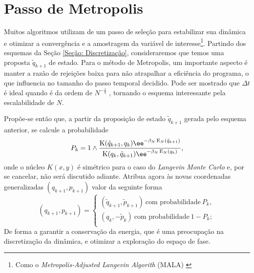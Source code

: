 \section{Passo de Metropolis}
\label{Section: Metropolis}

Muitos algoritmos utilizam de um passo de seleção para estabilizar sua dinâmica e otimizar a convergência e a amostragem da variável de interesse\footnote{Como o \textit{Metropolis-Adjusted Langevin Algorith} (MALA) \cite[Anexo~C]{leimmolecular}}. Partindo dos esquemas da Seção \ref{Seção: Discretização}, consideraremos que temos uma proposta $\tilde{q}_{k+1}$ de estado. Para o método de Metropolis, um importante aspecto é manter a razão de rejeições baixa para não atrapalhar a eficiência do programa, o que influencia no tamanho do passo temporal decidido. Pode ser mostrado que $\Delta t$ é ideal quando é da ordem de $N^{-\frac{1}{4}}$ \cite{Chafa2018}, tornando o esquema interessante pela escalabilidade de $N$.

Propõe-se então que, a partir da proposição de estado $\tilde{q}_{k+1}$ gerada pelo esquema anterior, se calcule a probabilidade
\begin{equation}
P_k = 1 \wedge \frac{\K(\tilde{q}_{k+1}, q_k) \ee^{-\beta_N \Ee_N(\tilde{q}_{k+1})}}{\K(q_k, \tilde{q}_{k+1}) \ee^{-\beta_N \Ee_N(q_{k})}},
\label{Equation: Pk}
\end{equation}
onde o núcleo $K(x, y)$ é simétrico \cite{Chafa2018} para o caso do \textit{Langevin Monte Carlo} e, por se cancelar, não será discutido adiante. Atribua agora às novas coordenadas generalizadas $(q_{k+1}, p_{k+1})$ valor da seguinte forma
\begin{equation}
	(q_{k+1}, p_{k+1}) =
\begin{cases}
	(\tilde{q}_{k+1}, \tilde{p}_{k+1}) \ \text{com probabilidade} \ P_k, \\
	(q_k, -\tilde{p}_{k}) \ \text{com probabilidade} \ 1-P_k; \\
\end{cases}
\label{Equation: Metropolis}
\end{equation}
De forma a garantir a conservação da energia, que é uma preocupação na discretização da dinâmica, e otimizar a exploração do espaço de fase.